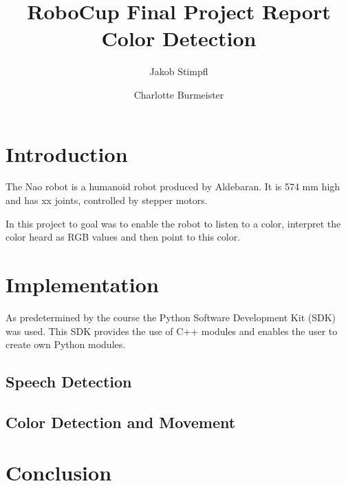\documentclass[a4paper]{article}
\title{RoboCup Final Project Report \\ Color Detection }
\author{Jakob Stimpfl \and Charlotte Burmeister}
\begin{document}
\maketitle
\tableofcontents




\section{Introduction}
The Nao robot is a humanoid robot produced by Aldebaran. It is 574 mm high and has xx joints, controlled by stepper motors.

In this project to goal was to enable the robot to listen to a color, interpret the color heard as RGB values and then point to this color.



\section{Implementation}

As predetermined by the course the Python Software Development Kit (SDK) was used.
This SDK provides the use of C++ modules and enables the user to create own Python modules.\cite{API}

\subsection{Speech Detection}
\subsection{Color Detection and Movement}
\section{Conclusion}

\printbibliography
\end{document}
